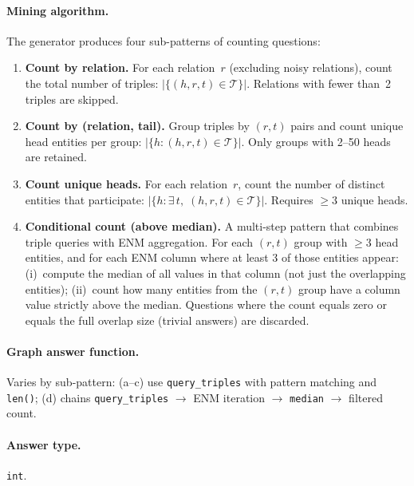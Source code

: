 \documentclass[11pt]{article}
\begin{document}
\paragraph{Mining algorithm.}
The generator produces four sub-patterns of counting questions:

\begin{enumerate}[leftmargin=2em, label=(\alph*)]
  \item \textbf{Count by relation.}  For each relation~$r$ (excluding
    noisy relations), count the total number of triples:
    $|\{(h,r,t) \in \mathcal{T}\}|$.  Relations with fewer than~2
    triples are skipped.

  \item \textbf{Count by (relation, tail).}  Group triples by
    $(r, t)$ pairs and count unique head entities per group:
    $|\{h : (h, r, t) \in \mathcal{T}\}|$.  Only groups with
    2--50 heads are retained.

  \item \textbf{Count unique heads.}  For each relation~$r$, count the
    number of distinct entities that participate:
    $|\{h : \exists\, t,\; (h, r, t) \in \mathcal{T}\}|$.  Requires
    $\geq 3$ unique heads.

  \item \textbf{Conditional count (above median).}  A multi-step pattern
    that combines triple queries with ENM aggregation.  For each
    $(r, t)$ group with $\geq 3$ head entities, and for each ENM column
    where at least 3 of those entities appear: (i)~compute the median of
    all values in that column (not just the overlapping entities);
    (ii)~count how many entities from the $(r, t)$ group have a column
    value strictly above the median.  Questions where the count equals
    zero or equals the full overlap size (trivial answers) are discarded.
\end{enumerate}

\paragraph{Graph answer function.}
Varies by sub-pattern: (a--c) use \texttt{query\_triples} with
pattern matching and \texttt{len()}; (d) chains
\texttt{query\_triples} $\to$ ENM iteration $\to$ \texttt{median}
$\to$ filtered count.

\paragraph{Answer type.} \texttt{int}.
\end{document}

